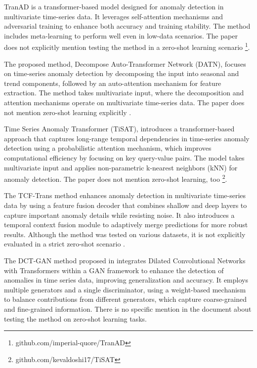 TranAD is a transformer-based model designed for anomaly detection in multivariate time-series data. It leverages self-attention mechanisms and adversarial training to enhance both accuracy and training stability. The method includes meta-learning to perform well even in low-data scenarios. The paper does not explicitly mention testing the method in a zero-shot learning scenario \cite{tuli_tranad_2022} \footnote{\fussy\tiny github.com/imperial-quore/TranAD}.

The proposed method, Decompose Auto-Transformer Network (DATN), focuses on time-series anomaly detection by decomposing the input into seasonal and trend components, followed by an auto-attention mechanism for feature extraction. The method takes multivariate input, where the decomposition and attention mechanisms operate on multivariate time-series data. The paper does not mention zero-shot learning explicitly \cite{wu_decompose_2023}.

Time Series Anomaly Transformer (TiSAT), introduces a transformer-based approach that captures long-range temporal dependencies in time-series anomaly detection using a probabilistic attention mechanism, which improves computational efficiency by focusing on key query-value pairs. The model takes multivariate input and applies non-parametric k-nearest neighbors (kNN) for anomaly detection. The paper does not mention zero-shot learning, too \cite{doshi_tisat_2022} \footnote{\fussy\tiny github.com/kevaldoshi17/TiSAT}.

The TCF-Trans method enhances anomaly detection in multivariate time-series data by using a feature fusion decoder that combines shallow and deep layers to capture important anomaly details while resisting noise. It also introduces a temporal context fusion module to adaptively merge predictions for more robust results. Although the method was tested on various datasets, it is not explicitly evaluated in a strict zero-shot scenario \cite{peng_tcf-trans_2023}.

The DCT-GAN method proposed in \cite{li_dct-gan_2023} integrates Dilated Convolutional Networks with Transformers within a GAN framework to enhance the detection of anomalies in time series data, improving generalization and accuracy. It employs multiple generators and a single discriminator, using a weight-based mechanism to balance contributions from different generators, which capture coarse-grained and fine-grained information. There is no specific mention in the document about testing the method on zero-shot learning tasks.


